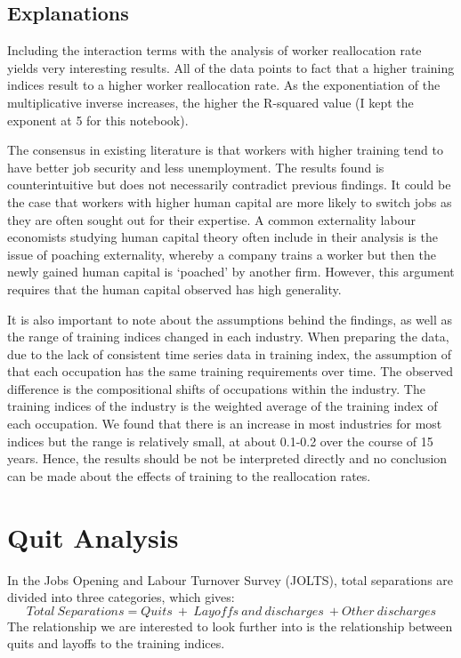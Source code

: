 \documentclass[
]{article}
\begin{document}
\hypertarget{explanations}{%
\subsection{Explanations}\label{explanations}}

Including the interaction terms with the analysis of worker reallocation
rate yields very interesting results. All of the data points to fact
that a higher training indices result to a higher worker reallocation
rate. As the exponentiation of the multiplicative inverse increases, the
higher the R-squared value (I kept the exponent at 5 for this notebook).

The consensus in existing literature is that workers with higher
training tend to have better job security and less unemployment. The
results found is counterintuitive but does not necessarily contradict
previous findings. It could be the case that workers with higher human
capital are more likely to switch jobs as they are often sought out for
their expertise. A common externality labour economists studying human
capital theory often include in their analysis is the issue of poaching
externality, whereby a company trains a worker but then the newly gained
human capital is `poached' by another firm. However, this argument
requires that the human capital observed has high generality.

It is also important to note about the assumptions behind the findings,
as well as the range of training indices changed in each industry. When
preparing the data, due to the lack of consistent time series data in
training index, the assumption of that each occupation has the same
training requirements over time. The observed difference is the
compositional shifts of occupations within the industry. The training
indices of the industry is the weighted average of the training index of
each occupation. We found that there is an increase in most industries
for most indices but the range is relatively small, at about 0.1-0.2
over the course of 15 years. Hence, the results should be not be
interpreted directly and no conclusion can be made about the effects of
training to the reallocation rates.

\hypertarget{quit-analysis}{%
\section{Quit Analysis}\label{quit-analysis}}

In the Jobs Opening and Labour Turnover Survey (JOLTS), total
separations are divided into three categories, which gives:
\[Total \ Separations = Quits \ + \ Layoffs \ and \ discharges \ + Other \ discharges \]
The relationship we are interested to look further into is the
relationship between quits and layoffs to the training indices.
\end{document}
